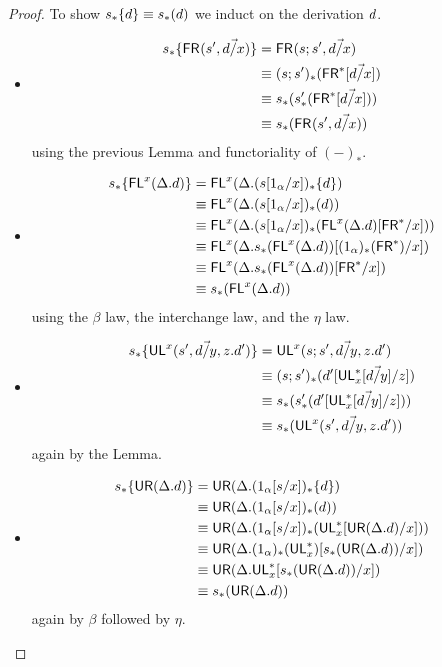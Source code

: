 \begin{proof}
To show $s_*\{d\} \equiv s_*(d)$ we induct on the derivation $d$.
\begin{itemize}
\item \begin{align*}
s_*\{\mathsf{FR}_{}(s',\vec{d/x})\} 
&= \mathsf{FR}_{}(s;s',\vec{d/x}) \\
&\equiv (s;s')_*(\mathsf{FR}^*[\vec{d/x}]) \\
&\equiv s_*(s'_*(\mathsf{FR}^*[\vec{d/x}])) \\
&\equiv s_*(\mathsf{FR}_{}(s',\vec{d/x}))
\end{align*}
using the previous Lemma and functoriality of $(-)_*$.
\item \begin{align*}
s_*\{\mathsf{FL}^{x}(\Delta.d)\} 
&= \mathsf{FL}^{x}(\Delta.(s[1_\alpha/x])_*\{d\}) \\
&\equiv \mathsf{FL}^{x}(\Delta.(s[1_\alpha/x])_*(d)) \\
&\equiv \mathsf{FL}^{x}(\Delta.(s[1_\alpha/x])_*(\mathsf{FL}^{x}(\Delta.d)[\mathsf{FR}^*/x]))\\
&\equiv \mathsf{FL}^{x}(\Delta. s_*(\mathsf{FL}^{x}(\Delta.d))[(1_\alpha)_*(\mathsf{FR}^*)/x])\\
&\equiv \mathsf{FL}^{x}(\Delta. s_*(\mathsf{FL}^{x}(\Delta.d))[\mathsf{FR}^*/x])\\
&\equiv s_*(\mathsf{FL}^{x}(\Delta.d)) 
\end{align*}
using the $\beta$ law, the interchange law, and the $\eta$ law.
\item \begin{align*}
s_*\{\mathsf{UL}^{x}_{}(s',\vec{d/y},z.d')\} 
&= \mathsf{UL}^{x}_{}(s;s',\vec{d/y},z.d') \\
&\equiv (s;s')_*(d'[\mathsf{UL}^*_{x}[\vec{d/y}]/z]) \\
&\equiv s_*(s'_*(d'[\mathsf{UL}^*_{x}[\vec{d/y}]/z])) \\
&\equiv s_*(\mathsf{UL}^{x}_{}(s',\vec{d/y},z.d')) 
\end{align*}
again by the Lemma.
\item \begin{align*}
s_*\{\mathsf{UR}(\Delta.d)\} 
&= \mathsf{UR}(\Delta.(1_\alpha[s/x])_*\{d\}) \\
&\equiv \mathsf{UR}(\Delta.(1_\alpha[s/x])_*(d)) \\
&\equiv \mathsf{UR}(\Delta.(1_\alpha[s/x])_*(\mathsf{UL}^*_{x}[\mathsf{UR}(\Delta.d)/x])) \\
&\equiv \mathsf{UR}(\Delta. (1_\alpha)_*(\mathsf{UL}^*_{x})[s_*(\mathsf{UR}(\Delta.d))/x]) \\
&\equiv \mathsf{UR}(\Delta. \mathsf{UL}^*_{x}[s_*(\mathsf{UR}(\Delta.d))/x]) \\
&\equiv s_*(\mathsf{UR}(\Delta.d))
\end{align*}
again by $\beta$ followed by $\eta$.
\end{itemize}


\end{proof}
